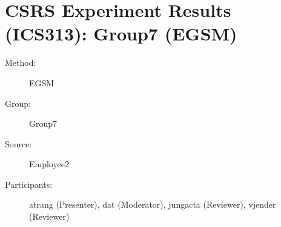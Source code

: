 
%          
	  
\chapter {CSRS Experiment Results (ICS313): Group7 (EGSM)}
\small

\begin{description}
\item [Method:] EGSM
\item [Group:] Group7
\item [Source:] Employee2
\item [Participants:] atrang (Presenter), dat (Moderator), jungacta (Reviewer), vjender (Reviewer)
\end{description}
